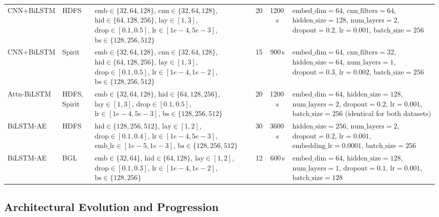 \documentclass{elektr}
\begin{document}
\begin{table}[htbp]
\begin{center}
\begin{tabular}{|l|l|p{4.8cm}|c|c|p{4.8cm}|}
CNN+BiLSTM & HDFS & $\text{emb}\in\{32, 64, 128\}$, $\text{cnn}\in\{32, 64, 128\}$, $\text{hid}\in\{64, 128, 256\}$, $\text{lay}\in[1, 3]$, $\text{drop}\in[0.1, 0.5]$, $\text{lr}\in[1e{-}4, 5e{-}3]$, $\text{bs}\in\{128, 256, 512\}$ & 20 & 1200\,s & $\text{embed\_dim}=64$, $\text{cnn\_filters}=64$, $\text{hidden\_size}=128$, $\text{num\_layers}=2$, $\text{dropout}=0.2$, $\text{lr}=0.001$, $\text{batch\_size}=256$ \\
CNN+BiLSTM & Spirit & $\text{emb}\in\{32, 64, 128\}$, $\text{cnn}\in\{32, 64, 128\}$, $\text{hid}\in\{64, 128, 256\}$, $\text{lay}\in[1, 3]$, $\text{drop}\in[0.1, 0.5]$, $\text{lr}\in[1e{-}4, 1e{-}2]$, $\text{bs}\in\{128, 256, 512\}$ & 15 & 900\,s & $\text{embed\_dim}=64$, $\text{cnn\_filters}=32$, $\text{hidden\_size}=64$, $\text{num\_layers}=1$, $\text{dropout}=0.3$, $\text{lr}=0.002$, $\text{batch\_size}=256$ \\
Attn-BiLSTM & HDFS, Spirit & $\text{emb}\in\{32, 64, 128\}$, $\text{hid}\in\{64, 128, 256\}$, $\text{lay}\in[1, 3]$, $\text{drop}\in[0.1, 0.5]$, $\text{lr}\in[1e{-}4, 5e{-}3]$, $\text{bs}\in\{128, 256, 512\}$ & 20 & 1200\,s & $\text{embed\_dim}=64$, $\text{hidden\_size}=128$, $\text{num\_layers}=2$, $\text{dropout}=0.2$, $\text{lr}=0.001$, $\text{batch\_size}=256$ (identical for both datasets) \\
BiLSTM-AE & HDFS & $\text{hid}\in\{128, 256, 512\}$, $\text{lay}\in[1, 2]$, $\text{drop}\in[0.1, 0.4]$, $\text{lr}\in[1e{-}4, 5e{-}3]$, $\text{emb\_lr}\in[1e{-}5, 1e{-}3]$, $\text{bs}\in\{128, 256, 512\}$ & 30 & 3600\,s & $\text{hidden\_size}=256$, $\text{num\_layers}=2$, $\text{dropout}=0.2$, $\text{lr}=0.001$, $\text{embedding\_lr}=0.0001$, $\text{batch\_size}=256$ \\
BiLSTM-AE & BGL & $\text{emb}\in\{32, 64\}$, $\text{hid}\in\{64, 128\}$, $\text{lay}\in[1, 2]$, $\text{drop}\in[0.1, 0.3]$, $\text{lr}\in[1e{-}4, 1e{-}2]$, $\text{bs}\in\{128, 256\}$ & 12 & 600\,s & $\text{embed\_dim}=64$, $\text{hidden\_size}=128$, $\text{num\_layers}=1$, $\text{dropout}=0.1$, $\text{lr}=0.001$, $\text{batch\_size}=128$ \\
\hline
\end{tabular}
\label{tab:optuna_specs}
\end{center}\vs{-4mm}
\end{table}

\subsection{Architectural Evolution and Progression}
\end{document}
